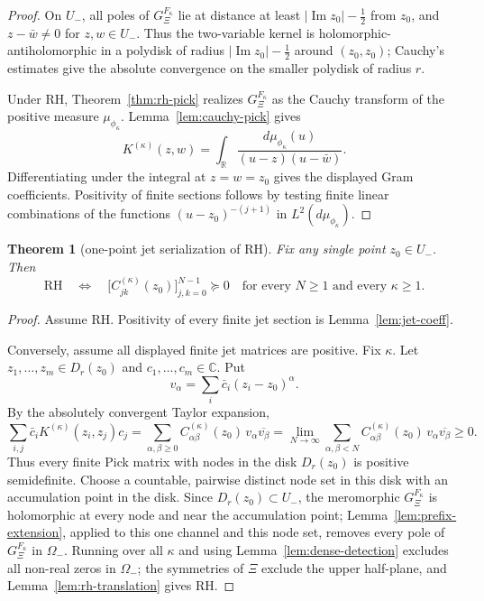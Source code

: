 \documentclass[11pt]{amsart}
\newtheorem{theorem}{Theorem}[section]
\theoremstyle{definition}
\theoremstyle{remark}
\theoremstyle{definition}
\renewcommand{\Im}{\operatorname{Im}}
\newcommand{\half}{\tfrac{1}{2}}
\newcommand{\R}{\mathbb{R}}
\newcommand{\C}{\mathbb{C}}
\newcommand{\GXi}{G_\Xi}
\begin{document}
\begin{proof}
On $U_-$, all poles of $\GXi^{F_\kappa}$ lie at distance at least $|\Im z_0|-\half$ from $z_0$, and
$z-\bar w\ne0$ for $z,w\in U_-$.  Thus the two-variable kernel is holomorphic-antiholomorphic in a
polydisk of radius $|\Im z_0|-\half$ around $(z_0,z_0)$; Cauchy's estimates give the absolute
convergence on the smaller polydisk of radius $r$.

Under RH, Theorem~\ref{thm:rh-pick} realizes $\GXi^{F_\kappa}$ as the Cauchy transform of the
positive measure $\mu_{\phi_\kappa}$.  Lemma~\ref{lem:cauchy-pick} gives
\[
   K^{(\kappa)}(z,w)
   =
   \int_\R\frac{d\mu_{\phi_\kappa}(u)}{(u-z)(u-\bar w)}.
\]
Differentiating under the integral at $z=w=z_0$ gives the displayed Gram coefficients.  Positivity of
finite sections follows by testing finite linear combinations of the functions
$(u-z_0)^{-(j+1)}$ in $L^2(d\mu_{\phi_\kappa})$.
\end{proof}

\begin{theorem}[one-point jet serialization of RH]\label{thm:one-point-jets}
Fix any single point $z_0\in U_-$.  Then
\[
   \mathrm{RH}
   \quad\Longleftrightarrow\quad
   \bigl[C^{(\kappa)}_{jk}(z_0)\bigr]_{j,k=0}^{N-1}\succeq0
   \quad\text{for every }N\ge1\text{ and every }\kappa\ge1 .
\]
\end{theorem}

\begin{proof}
Assume RH.  Positivity of every finite jet section is Lemma~\ref{lem:jet-coeff}.

Conversely, assume all displayed finite jet matrices are positive.  Fix $\kappa$.  Let
$z_1,\ldots,z_m\in D_r(z_0)$ and $c_1,\ldots,c_m\in\C$.  Put
\[
   v_\alpha=\sum_i \bar c_i(z_i-z_0)^\alpha.
\]
By the absolutely convergent Taylor expansion,
\[
   \sum_{i,j}\bar c_iK^{(\kappa)}(z_i,z_j)c_j
   =
   \sum_{\alpha,\beta\ge0}
      C^{(\kappa)}_{\alpha\beta}(z_0)\,v_\alpha\overline{v_\beta}
   =
   \lim_{N\to\infty}
   \sum_{\alpha,\beta<N}
      C^{(\kappa)}_{\alpha\beta}(z_0)\,v_\alpha\overline{v_\beta}
   \ge0.
\]
Thus every finite Pick matrix with nodes in the disk $D_r(z_0)$ is positive semidefinite.  Choose a
countable, pairwise distinct node set in this disk with an accumulation point in the disk.  Since
$D_r(z_0)\subset U_-$, the meromorphic $\GXi^{F_\kappa}$ is holomorphic at every node and near the
accumulation point; Lemma~\ref{lem:prefix-extension}, applied to this one channel and this node set,
removes every pole of $\GXi^{F_\kappa}$ in $\Omega_-$.  Running over all $\kappa$ and using
Lemma~\ref{lem:dense-detection} excludes all non-real zeros in $\Omega_-$; the symmetries of $\Xi$
exclude the upper half-plane, and Lemma~\ref{lem:rh-translation} gives RH.
\end{proof}
\end{document}
